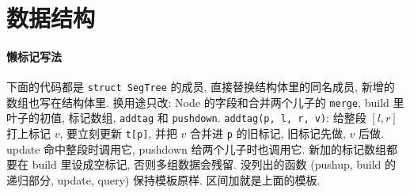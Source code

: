 \section{数据结构}


\begingroup\footnotesize\lstset{basicstyle=\scriptsize\ttfamily}
\paragraph{懒标记写法}
下面的代码都是 \texttt{struct SegTree} 的成员, 直接替换结构体里的同名成员, 新增的数组也写在结构体里.
换用途只改: Node 的字段和合并两个儿子的 \texttt{merge}, build 里叶子的初值, 标记数组, \texttt{addtag} 和 \texttt{pushdown}.
\texttt{addtag(p, l, r, v)}: 给整段 $[l, r]$ 打上标记 $v$, 要立刻更新 \texttt{t[p]}, 并把 $v$ 合并进 \texttt{p} 的旧标记, 旧标记先做, $v$ 后做.
update 命中整段时调用它, pushdown 给两个儿子时也调用它. 新加的标记数组都要在 build 里设成空标记, 否则多组数据会残留.
没列出的函数 (pushup, build 的递归部分, update, query) 保持模板原样. 区间加就是上面的模板.
